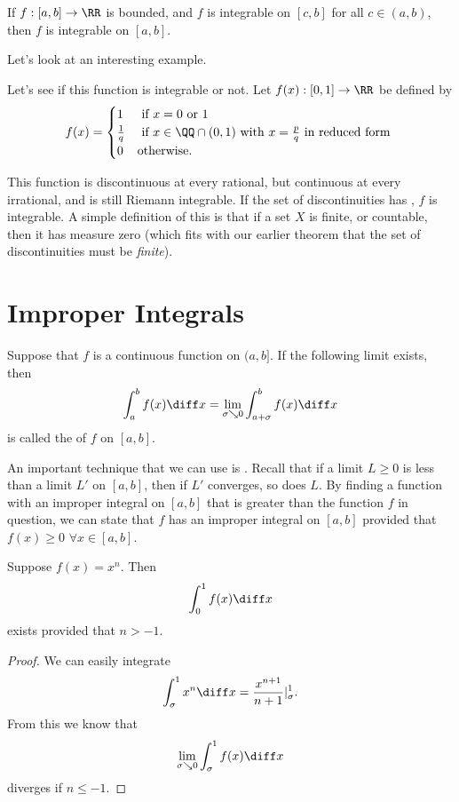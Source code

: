 \begin{theorem}
If $f: [a,b] \to \RR$ is bounded, and $f$ is integrable on $[c,b]$ for all $c \in (a,b)$, then $f$ is integrable on $[a,b]$. 
\end{theorem}

Let's look at an interesting example. 

\begin{example} Let's see if this function is integrable or not. \newline
Let $f(x): [0,1] \to \RR$ be defined by 
\[ f(x) = \begin{cases} 1 &\text{ if } x = 0 \text{ or } 1 \\ \frac{1}{q} &\text{ if } x \in \QQ \cap (0,1) \text { with } x = \frac{p}{q} \text { in reduced form } \\ 0 &\text{otherwise.} \end{cases} \]
\end{example}
This function is discontinuous at every rational, but continuous at every irrational, and is still Riemann integrable. If the set of discontinuities has , $f$ is integrable. A simple definition of this is that if a set $X$ is finite, or countable, then it has measure zero (which fits with our earlier theorem that the set of discontinuities must be \emph{finite}).

\section{Improper Integrals}
\begin{definition}
Suppose that $f$ is a continuous function on $(a,b]$. If the following limit exists, then 
\[ \int_a^b f(x) \diff x = \lim_{\sigma\searrow 0}\int_{a + \sigma}^b f(x) \diff x \] is called the  of $f$ on $[a,b]$. 
\end{definition}

An important technique that we can use is . Recall that if a limit $L \geq 0$ is less than a limit $L'$ on $[a,b]$, then if $L'$ converges, so does $L$. By finding a function with an improper integral on $[a,b]$ that is greater than the function $f$ in question, we can state that $f$ has an improper integral on $[a,b]$ provided that $f(x) \geq 0$ $\forall x \in [a,b]$. \newpage

\begin{proposition}
Suppose $f(x) = x^{n}$. Then 
\[ \int_0^1 f(x) \diff x \] exists provided that $n > -1$.
\end{proposition}
\begin{proof}
We can easily integrate  
\[ \int_\sigma^1 x^n \diff x = \dfrac{x^{n+1}}{n+1} \vert_\sigma^1 .\] From this we know that 
\[ \lim_{\sigma \searrow 0} \int_\sigma^1 f(x) \diff x \] diverges if $n \leq -1$. 
\end{proof}

